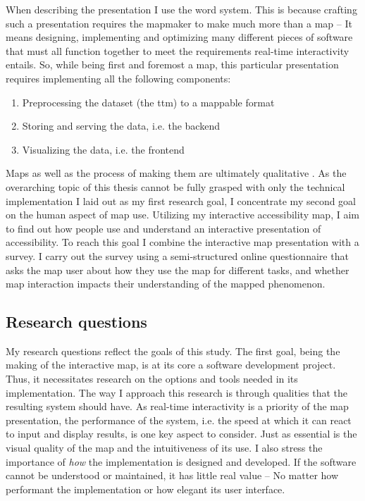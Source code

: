 When describing the presentation I use the word system.
This is because crafting such a presentation
requires the mapmaker to make much more than a map --
It means designing, implementing and optimizing
many different pieces of software that must all function together
to meet the requirements real-time interactivity entails.
So, while being first and foremost a map, this particular presentation
requires implementing all the following components:
\begin{enumerate}
	\item Preprocessing the dataset (the \acrlong{ttm}) to a mappable format
	\item Storing and serving the data, i.e. the backend
	\item Visualizing the data, i.e. the frontend
\end{enumerate}

Maps as well as the process of making them are ultimately qualitative
\parencite{cop2009}.
As the overarching topic of this thesis
cannot be fully grasped with only the technical implementation
I laid out as my first research goal,
I concentrate my second goal on the human aspect of map use.
Utilizing my interactive accessibility map,
I aim to find out how
people use and understand an interactive presentation of accessibility.
To reach this goal I combine
the interactive map presentation with a survey.
I carry out the survey using a semi-structured online questionnaire
that asks the map user about how they use the map for different tasks,
and whether map interaction impacts their understanding of the mapped phenomenon.

\subsection{Research questions}

My research questions reflect the goals of this study.  %
The first goal, being the making of the interactive map,
is at its core a software development project.
Thus, it necessitates research on the options and tools
needed in its implementation.
The way I approach this research is through qualities
that the resulting system should have.
As real-time interactivity is a priority of the map presentation,
the performance of the system,
i.e. the speed at which it can react to input and display results,
is one key aspect to consider.
Just as essential is the visual quality of the map
and the intuitiveness of its use.
I also stress the importance of
\textit{how} the implementation is designed and developed.
If the software cannot be understood or maintained,
it has little real value --
No matter how performant the implementation or how elegant its user interface.

